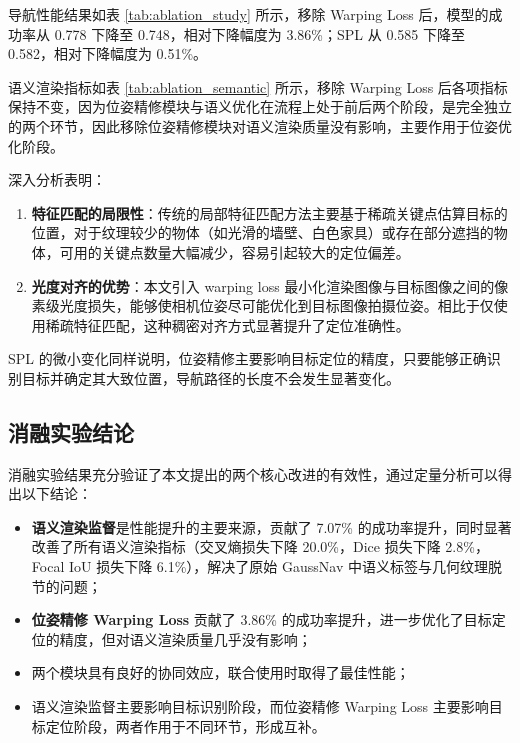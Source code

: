 导航性能结果如表 \ref{tab:ablation_study} 所示，移除 Warping Loss 后，模型的成功率从 0.778 下降至 0.748，相对下降幅度为 3.86\%；SPL 从 0.585 下降至 0.582，相对下降幅度为 0.51\%。

语义渲染指标如表 \ref{tab:ablation_semantic} 所示，移除 Warping Loss 后各项指标保持不变，因为位姿精修模块与语义优化在流程上处于前后两个阶段，是完全独立的两个环节，因此移除位姿精修模块对语义渲染质量没有影响，主要作用于位姿优化阶段。

深入分析表明：
\begin{enumerate}
    \item \textbf{特征匹配的局限性}：传统的局部特征匹配方法主要基于稀疏关键点估算目标的位置，对于纹理较少的物体（如光滑的墙壁、白色家具）或存在部分遮挡的物体，可用的关键点数量大幅减少，容易引起较大的定位偏差。
    
    \item \textbf{光度对齐的优势}：本文引入 warping loss 最小化渲染图像与目标图像之间的像素级光度损失，能够使相机位姿尽可能优化到目标图像拍摄位姿。相比于仅使用稀疏特征匹配，这种稠密对齐方式显著提升了定位准确性。

\end{enumerate}

SPL 的微小变化同样说明，位姿精修主要影响目标定位的精度，只要能够正确识别目标并确定其大致位置，导航路径的长度不会发生显著变化。

\subsection{消融实验结论}
消融实验结果充分验证了本文提出的两个核心改进的有效性，通过定量分析可以得出以下结论：

\begin{itemize}
    \item \textbf{语义渲染监督}是性能提升的主要来源，贡献了 7.07\% 的成功率提升，同时显著改善了所有语义渲染指标（交叉熵损失下降 20.0\%，Dice 损失下降 2.8\%，Focal IoU 损失下降 6.1\%），解决了原始 GaussNav 中语义标签与几何纹理脱节的问题；
    
    \item \textbf{位姿精修 Warping Loss} 贡献了 3.86\% 的成功率提升，进一步优化了目标定位的精度，但对语义渲染质量几乎没有影响；
    
    \item 两个模块具有良好的协同效应，联合使用时取得了最佳性能；
    
    \item 语义渲染监督主要影响目标识别阶段，而位姿精修 Warping Loss 主要影响目标定位阶段，两者作用于不同环节，形成互补。
\end{itemize}

